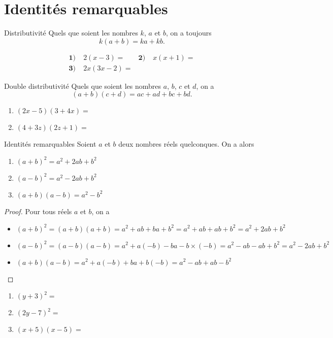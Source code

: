 \documentclass[11pt]{article}
\begin{document}
\section{Identités remarquables}
\begin{propnom}{Distributivité}
  Quels que soient les nombres $k$, $a$ et $b$, on a toujours
  \[
    k(a+b) = ka+kb.
  \]
\end{propnom}
\begin{exemple}
  \begin{align*}
    \textbf{1)}\;& 2(x-3) = &
    \textbf{2)}\;& x(x+1) = \\
    \textbf{3)}\;& 2x(3x-2) =
  \end{align*}
\end{exemple}
\begin{propnom}{Double distributivité}
  Quels que soient les nombres $a$, $b$, $c$ et $d$, on a
  \[
    (a+b)(c+d) = ac+ad+bc+bd.
  \]
\end{propnom}
\begin{exemple}
  \begin{enumerate}
    \item $(2x-5)(3+4x) = $
    \item $(4+3z)(2z+1) = $
  \end{enumerate}
\end{exemple}
\begin{propnom}{Identités remarquables}
  Soient $a$ et $b$ deux nombres réels quelconques. On a alors
  \begin{enumerate}
    \item $(a+b)^2 = a^2+2ab+b^2$
    \item $(a-b)^2 = a^2-2ab+b^2$
    \item $(a+b)(a-b) = a^2-b^2$
  \end{enumerate}
\end{propnom}
\begin{proof}
  Pour tous réels $a$ et $b$, on a 
  \begin{itemize}
    \item $(a+b)^2=(a+b)(a+b)=a^2+ab+ba+b^2= a^2+ab+ab+b^2=a^2+2ab+b^2$
    \item $(a-b)^2=(a-b)(a-b)=a^2+a(-b)-ba-b\times(-b)= a^2-ab-ab+b^2=a^2-2ab+b^2$
    \item $(a+b)(a-b)=a^2+a(-b)+ba+b(-b)=a^2-ab+ab-b^2$
  \end{itemize}
\end{proof}
\begin{exemple}
  \begin{enumerate}
    \item $(y+3)^2 = $
    \item $(2y-7)^2 = $
    \item $(x+5)(x-5) =$
  \end{enumerate}
\end{exemple}
\end{document}
